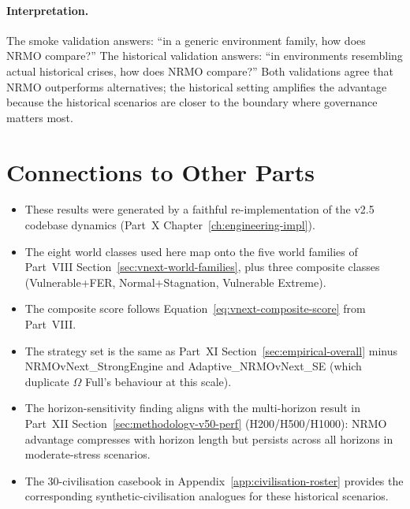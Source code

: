 \paragraph{Interpretation.}
The smoke validation answers: ``in a generic environment family,
how does NRMO compare?'' The historical validation answers:
``in environments resembling actual historical crises, how does
NRMO compare?'' Both validations agree that NRMO outperforms
alternatives; the historical setting amplifies the advantage
because the historical scenarios are closer to the boundary
where governance matters most.

\section*{Connections to Other Parts}

\begin{itemize}
\item These results were generated by a faithful re-implementation
of the v2.5 codebase dynamics
(Part~X Chapter~\ref{ch:engineering-impl}).
\item The eight world classes used here map onto the five world
families of Part~VIII
Section~\ref{sec:vnext-world-families}, plus three composite
classes (Vulnerable+FER, Normal+Stagnation, Vulnerable Extreme).
\item The composite score follows
Equation~\ref{eq:vnext-composite-score} from Part~VIII.
\item The strategy set is the same as Part~XI
Section~\ref{sec:empirical-overall} minus
NRMOvNext\_StrongEngine and Adaptive\_NRMOvNext\_SE (which
duplicate $\Omega$ Full's behaviour at this scale).
\item The horizon-sensitivity finding aligns with the multi-horizon
result in Part~XII
Section~\ref{sec:methodology-v50-perf} (H200/H500/H1000): NRMO
advantage compresses with horizon length but persists across all
horizons in moderate-stress scenarios.
\item The 30-civilisation casebook in
Appendix~\ref{app:civilisation-roster} provides the corresponding
synthetic-civilisation analogues for these historical scenarios.
\end{itemize}
